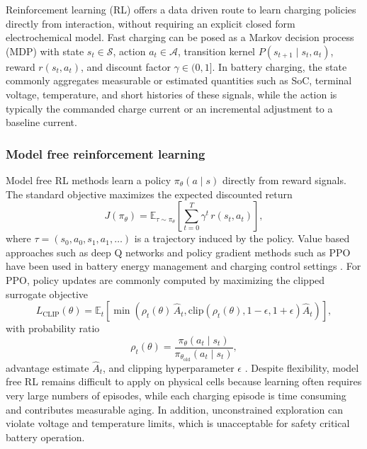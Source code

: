 \documentclass[%
 aip,
 amsmath,amssymb,
reprint, onecolumn %
]{revtex4-1}
\begin{document}
Reinforcement learning (RL) offers a data driven route to learn charging policies directly from interaction, without requiring an explicit closed form electrochemical model. Fast charging can be posed as a Markov decision process (MDP) with state $s_t \in \mathcal{S}$, action $a_t \in \mathcal{A}$, transition kernel $P(s_{t+1}\mid s_t,a_t)$, reward $r(s_t,a_t)$, and discount factor $\gamma \in (0,1]$. In battery charging, the state commonly aggregates measurable or estimated quantities such as SoC, terminal voltage, temperature, and short histories of these signals, while the action is typically the commanded charge current or an incremental adjustment to a baseline current.

\subsubsection{Model free reinforcement learning}
Model free RL methods learn a policy $\pi_\theta(a\mid s)$ directly from reward signals. The standard objective maximizes the expected discounted return
\begin{equation}
J(\pi_\theta)
=
\mathbb{E}_{\tau \sim \pi_\theta}
\left[
\sum_{t=0}^{T}
\gamma^{t}\, r(s_t,a_t)
\right],
\label{eq_return_objective}
\end{equation}
where $\tau=(s_0,a_0,s_1,a_1,\dots)$ is a trajectory induced by the policy. Value based approaches such as deep Q networks and policy gradient methods such as PPO have been used in battery energy management and charging control settings \cite{liu2019brief,wu2020battery,schulman2017proximal}. For PPO, policy updates are commonly computed by maximizing the clipped surrogate objective
\begin{equation}
L_{\text{CLIP}}(\theta)
=
\mathbb{E}_{t}
\left[
\min
\left(
\rho_t(\theta)\,\hat{A}_t,
\text{clip}\!\left(\rho_t(\theta),1-\epsilon,1+\epsilon\right)\hat{A}_t
\right)
\right],
\label{eq_ppo_clip}
\end{equation}
with probability ratio
\begin{equation}
\rho_t(\theta)
=
\frac{\pi_\theta(a_t\mid s_t)}{\pi_{\theta_{\text{old}}}(a_t\mid s_t)},
\label{eq_ppo_ratio}
\end{equation}
advantage estimate $\hat{A}_t$, and clipping hyperparameter $\epsilon$ \cite{schulman2017proximal}. Despite flexibility, model free RL remains difficult to apply on physical cells because learning often requires very large numbers of episodes, while each charging episode is time consuming and contributes measurable aging. In addition, unconstrained exploration can violate voltage and temperature limits, which is unacceptable for safety critical battery operation.
\end{document}
